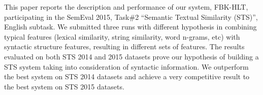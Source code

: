 This paper reports the description and performance of our system, FBK-HLT, participating in the SemEval 2015, Task\#2 ``Semantic Textual Similarity (STS)'', English subtask. We submitted three runs with different hypothesis in combining typical features (lexical similarity, string similarity, word n-grams, etc) with syntactic structure features, resulting in different sets of features. The results evaluated on both STS 2014 and 2015 datasets prove our hypothesis of building a STS system taking into consideration of syntactic information. We outperform the best system on STS 2014 datasets and achieve a very competitive result to the best system on STS 2015 datasets.
